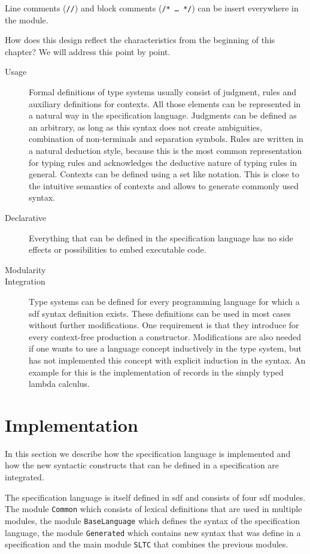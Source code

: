 Line comments (\verb|//|) and block comments (\verb|/* … */|) can be
insert everywhere in the module.

How does this design reflect the characteristics from the beginning of
this chapter? We will address this point by point.

\begin{description}
\item[Usage] Formal definitions of type systems usually consist of
  judgment, rules and auxiliary definitions for contexts. All those
  elements can be represented in a natural way in the specification
  language. Judgments can be defined as an arbitrary, as long as this
  syntax does not create ambiguities, combination of non-terminals and
  separation symbols. Rules are written in a natural deduction style,
  because this is the most common representation for typing rules and
  acknowledges the deductive nature of typing rules in
  general. Contexts can be defined using a set like notation. This is
  close to the intuitive semantics of contexts and allows to generate
  commonly used syntax.
\item[Declarative] Everything that can be defined in the specification
  language has no side effects or possibilities to embed executable
  code.
\item[Modularity] 
\item[Integration] Type systems can be defined for every programming
  language for which a \gls{sdf} syntax definition exists. These
  definitions can be used in most cases without further
  modifications. One requirement is that they introduce for every
  context-free production a constructor. Modifications are also needed
  if one wants to use a language concept inductively in the type
  system, but has not implemented this concept with explicit induction
  in the syntax. An example for this is the implementation of records
  in the simply typed lambda calculus. 
\end{description}
\section{Implementation}
\label{sec:generate-sdf}
In this section we describe how the specification language is
implemented and how the new syntactic constructs that can be defined
in a specification are integrated.

The specification language is itself defined in \gls{sdf} and consists
of four \gls{sdf} modules. The module \verb|Common| which consists of
lexical definitions that are used in multiple modules, the module
\verb|BaseLanguage| which defines the syntax of the specification
language, the module \verb|Generated| which contains new syntax that
was define in a specification and the main module \verb|SLTC| that
combines the previous modules.

